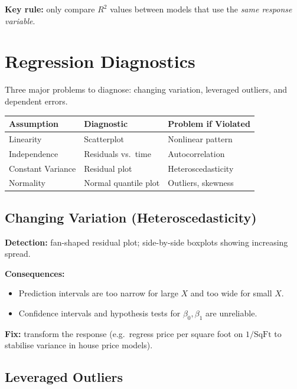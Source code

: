 \documentclass[12pt, a4paper]{article}
\begin{document}
\textbf{Key rule:} only compare $R^2$ values between models that use the \emph{same response variable}.

\section{Regression Diagnostics}

Three major problems to diagnose: changing variation, leveraged outliers, and dependent errors.

\begin{center}
\begin{tabular}{lll}
\toprule
\textbf{Assumption} & \textbf{Diagnostic} & \textbf{Problem if Violated} \\
\midrule
Linearity         & Scatterplot          & Nonlinear pattern \\
Independence      & Residuals vs.\ time  & Autocorrelation \\
Constant Variance & Residual plot        & Heteroscedasticity \\
Normality         & Normal quantile plot & Outliers, skewness \\
\bottomrule
\end{tabular}
\end{center}

\subsection{Changing Variation (Heteroscedasticity)}

\textbf{Detection:} fan-shaped residual plot; side-by-side boxplots showing increasing spread.

\textbf{Consequences:}
\begin{itemize}
  \item Prediction intervals are too narrow for large $X$ and too wide for small $X$.
  \item Confidence intervals and hypothesis tests for $\beta_0, \beta_1$ are unreliable.
\end{itemize}

\textbf{Fix:} transform the response (e.g.\ regress price per square foot on $1/\text{SqFt}$ to stabilise variance in house price models).

\subsection{Leveraged Outliers}
\end{document}

